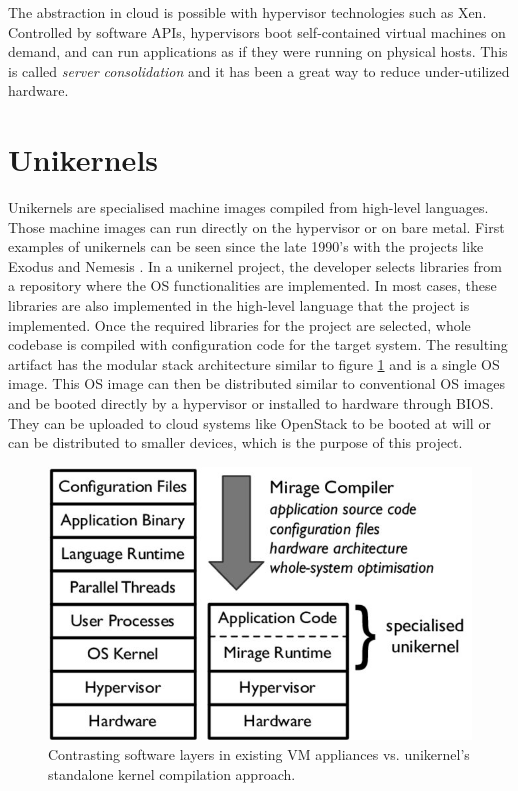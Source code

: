 The abstraction in cloud is possible with hypervisor technologies such as Xen. Controlled by software APIs, hypervisors boot self-contained virtual machines on demand, and can run applications as if they were running on physical hosts. This is called \textit{server consolidation} and it has been a great way to reduce under-utilized hardware.

\section{Unikernels}
Unikernels \cite{library-operating-system} \cite{madhavapeddy2014unikernels} are specialised machine images compiled from high-level languages. Those machine images can run directly on the hypervisor or on bare metal. First examples of unikernels can be seen since the late 1990's with the projects like Exodus\cite{exokernel} and Nemesis \cite{nemesis}. In a unikernel project, the developer selects libraries from a repository where the OS functionalities are implemented. In most cases, these libraries are also implemented in the high-level language that the project is implemented. Once the required libraries for the project are selected, whole codebase is compiled with configuration code for the target system. The resulting artifact has the modular stack architecture similar to figure \ref{fig:unikernel-arch} and is a single OS image. This OS image can then be distributed similar to conventional OS images and be booted directly by a hypervisor or installed to hardware through BIOS. They can be uploaded to cloud systems like OpenStack \cite{openstack} to be booted at will or can be distributed to smaller devices, which is the purpose of this project.

\begin{figure}[htpb]
  \centering
  \includegraphics[height=0.3\textwidth]{figures/Contrasting-software-layers-in-existing-VM-appliances-vs-unikernels-standalone-kernel_W640.jpg}
  \caption{ Contrasting software layers in existing VM appliances vs. unikernel’s standalone kernel compilation approach. \cite{library-operating-system}} \label{fig:unikernel-arch}
\end{figure}


